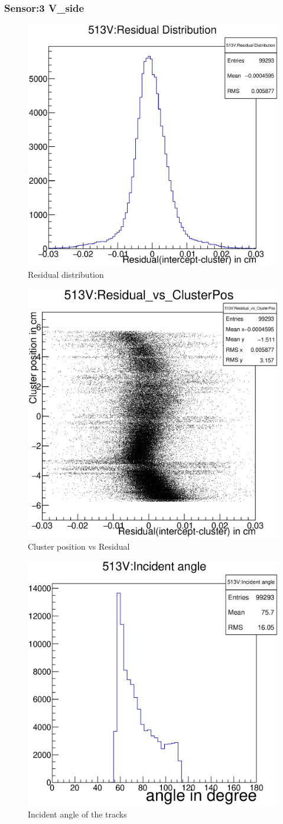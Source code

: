 \documentclass[12pt]{article}
\begin{document}
					\subsubsection{Sensor:3 V\_side}
					\begin{multicols}{3}
						\begin{figure}[H]
							\includegraphics[width=.3\textwidth]{513V:residualplot.eps}	
							\caption{Residual distribution}	
							\label{fig1}	
						\end{figure}
						\begin{figure}[H]
							\includegraphics[width=.3\textwidth]{513V:residual_vs_clusterpos.eps}	
							\caption{Cluster position vs Residual}	
							\label{fig2}	
						\end{figure}
						\begin{figure}[H]
							\includegraphics[width=.3\textwidth]{513V:incident_angle.eps}	
							\caption{Incident angle of the tracks}	
							\label{fig2}	
						\end{figure}
					\end{multicols}
					
\end{document}
